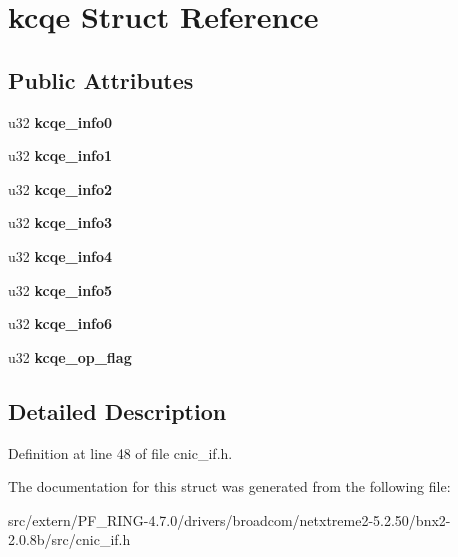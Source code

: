 \hypertarget{structkcqe}{
\section{kcqe Struct Reference}
\label{structkcqe}
}
\subsection*{Public Attributes}
\begin{DoxyCompactItemize}
\item 
\hypertarget{structkcqe_aaf250a79aae5c07cb80edde83d379e44}{
u32 {\bfseries kcqe\_\-info0}}
\label{structkcqe_aaf250a79aae5c07cb80edde83d379e44}

\item 
\hypertarget{structkcqe_a45724d0bbc820f9f4cfa61d97d846163}{
u32 {\bfseries kcqe\_\-info1}}
\label{structkcqe_a45724d0bbc820f9f4cfa61d97d846163}

\item 
\hypertarget{structkcqe_a40a88badeab2d76c64856b3368ab1922}{
u32 {\bfseries kcqe\_\-info2}}
\label{structkcqe_a40a88badeab2d76c64856b3368ab1922}

\item 
\hypertarget{structkcqe_a56d26ccd801866f20dabab25ff622cae}{
u32 {\bfseries kcqe\_\-info3}}
\label{structkcqe_a56d26ccd801866f20dabab25ff622cae}

\item 
\hypertarget{structkcqe_aa09b86025182b746f6c00c7bd10c6473}{
u32 {\bfseries kcqe\_\-info4}}
\label{structkcqe_aa09b86025182b746f6c00c7bd10c6473}

\item 
\hypertarget{structkcqe_a5390c23e8402ec2e2d54f627f81bd1bb}{
u32 {\bfseries kcqe\_\-info5}}
\label{structkcqe_a5390c23e8402ec2e2d54f627f81bd1bb}

\item 
\hypertarget{structkcqe_a764bd5244c05e8a7a012409a837ccf82}{
u32 {\bfseries kcqe\_\-info6}}
\label{structkcqe_a764bd5244c05e8a7a012409a837ccf82}

\item 
\hypertarget{structkcqe_a95e38bb4e6440eeecb003d57241e11d4}{
u32 {\bfseries kcqe\_\-op\_\-flag}}
\label{structkcqe_a95e38bb4e6440eeecb003d57241e11d4}

\end{DoxyCompactItemize}


\subsection{Detailed Description}


Definition at line 48 of file cnic\_\-if.h.



The documentation for this struct was generated from the following file:\begin{DoxyCompactItemize}
\item 
src/extern/PF\_\-RING-\/4.7.0/drivers/broadcom/netxtreme2-\/5.2.50/bnx2-\/2.0.8b/src/cnic\_\-if.h\end{DoxyCompactItemize}
